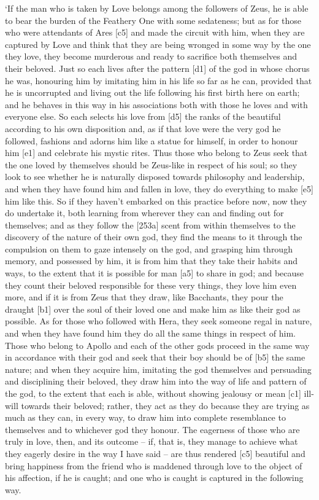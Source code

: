 ‘If the man who is taken by Love belongs among the followers of Zeus, he
is able to bear the burden of the Feathery One with some sedateness; but
as for those who were attendants of
Ares {[}c5{]} and made
the circuit with him, when they are captured by Love and think that they
are being wronged in some way by the one they love, they become
murderous and ready to sacrifice both themselves and their beloved. Just
so each lives after the pattern {[}d1{]} of the god in whose chorus he
was, honouring him by imitating him in his life so far as he can,
provided that he is uncorrupted and living out the life following his
first birth here on earth; and he behaves in this way in his
associations both with those he loves and with everyone else. So each
selects his love from {[}d5{]} the ranks of the beautiful according to
his own disposition and, as if that love were the very god he followed,
fashions and adorns him like a statue for himself, in order to honour
him {[}e1{]} and celebrate his mystic rites. Thus those who belong to
Zeus seek that the one loved by themselves should be Zeus-like in
respect of his soul; so they look to see whether he is naturally
disposed towards philosophy and leadership, and when they have found him
and fallen in love, they do everything to make {[}e5{]} him like this.
So if they haven't embarked on this
practice before now, now
they do undertake it, both learning from wherever they can and finding
out for themselves; and as they follow the {[}253a{]} scent from within
themselves to the discovery of the nature of their own god, they find
the means to it through the compulsion on them to gaze intensely on the
god, and grasping him through memory, and possessed by him, it is from
him that they take their habits and ways, to the extent that it is
possible for man {[}a5{]} to share in god; and because they count their
beloved responsible for these very things, they love him even more, and
if it is from Zeus that they draw, like Bacchants, they pour the draught
{[}b1{]} over the soul of their loved one and make him as like their god
as possible. As for those who followed with Hera, they seek someone
regal in nature, and when they have found him they do all the same
things in respect of him. Those who belong to Apollo and each of the
other gods proceed in the same way in accordance with their god and seek
that their boy should be of {[}b5{]} the same nature; and when they
acquire him, imitating the god themselves and persuading and
disciplining their beloved, they draw him into the way of life and
pattern of the god, to the extent that each is able, without showing
jealousy or mean {[}c1{]} ill-will towards their beloved; rather, they
act as they do because they are trying as much as they can, in every
way, to draw him into complete resemblance to themselves and to
whichever god they honour. The eagerness of those who are truly in love,
then, and its outcome --
if, that is, they manage to achieve what they eagerly desire in the way
I have said -- are thus rendered {[}c5{]} beautiful and bring happiness
from the friend who is maddened through love to the object of his
affection, if he is caught; and one who is caught is captured in the
following way.

